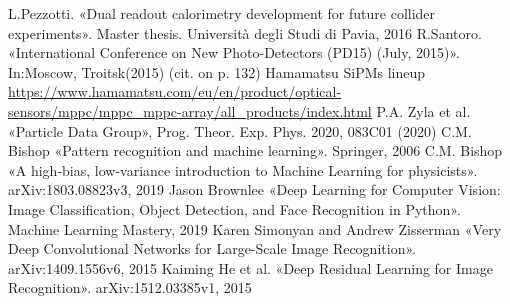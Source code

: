 \documentclass[a4paper,11pt,titlepage,oneside,openright]{book}	%
\begin{document}
\begin{backmatter}
\begin{thebibliography}{99}
			 L.Pezzotti. «Dual readout calorimetry development for future collider experiments». Master thesis. Università degli Studi di Pavia, 2016
			 R.Santoro. «International Conference on New Photo-Detectors (PD15) (July, 2015)». In:Moscow, Troitsk(2015) (cit. on p. 132)
			 Hamamatsu SiPMs lineup \url{https://www.hamamatsu.com/eu/en/product/optical-sensors/mppc/mppc_mppc-array/all_products/index.html}
			 P.A. Zyla et al. «Particle Data Group», Prog. Theor. Exp. Phys. 2020, 083C01 (2020)
			 C.M. Bishop «Pattern recognition and machine learning». Springer, 2006
			 C.M. Bishop «A high-bias, low-variance introduction to Machine Learning for physicists». arXiv:1803.08823v3, 2019
			 Jason Brownlee «Deep Learning for Computer Vision: Image Classification, Object Detection, and Face Recognition in Python». Machine Learning Mastery, 2019
			 Karen Simonyan and Andrew Zisserman «Very Deep Convolutional Networks for Large-Scale Image Recognition». arXiv:1409.1556v6, 2015
			 Kaiming He et al. «Deep Residual Learning for Image Recognition». arXiv:1512.03385v1, 2015
		\end{thebibliography}
		
	\end{backmatter}
	
	
\end{document}
